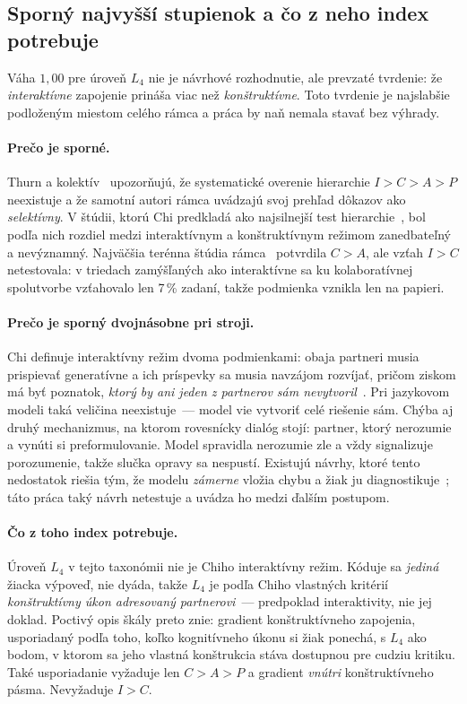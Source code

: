 \subsection{Sporný najvyšší stupienok a čo z neho index potrebuje}
\label{sec:icap-rung}

Váha $1{,}00$ pre úroveň $L_4$ nie je návrhové rozhodnutie, ale prevzaté tvrdenie: že \emph{interaktívne} zapojenie prináša viac než \emph{konštruktívne}. Toto tvrdenie je najslabšie podloženým miestom celého rámca a práca by naň nemala stavať bez výhrady.

\paragraph{Prečo je sporné.} Thurn a kolektív~\cite{thurn2023icapcritique} upozorňujú, že systematické overenie hierarchie $I>C>A>P$ neexistuje a že samotní autori rámca uvádzajú svoj prehľad dôkazov ako \emph{selektívny}. V štúdii, ktorú Chi predkladá ako najsilnejší test hierarchie~\cite{menekse2013dola}, bol podľa nich rozdiel medzi interaktívnym a konštruktívnym režimom zanedbateľný a nevýznamný. Najväčšia terénna štúdia rámca~\cite{chi2018translating} potvrdila $C>A$, ale vzťah $I>C$ netestovala: v triedach zamýšľaných ako interaktívne sa ku kolaboratívnej spolutvorbe vzťahovalo len 7\,\% zadaní, takže podmienka vznikla len na papieri.

\paragraph{Prečo je sporný dvojnásobne pri stroji.} Chi definuje interaktívny režim dvoma podmienkami: obaja partneri musia prispievať generatívne a ich príspevky sa musia navzájom rozvíjať, pričom ziskom má byť poznatok, \emph{ktorý by ani jeden z partnerov sám nevytvoril}~\cite{chi2018translating}. Pri jazykovom modeli taká veličina neexistuje~--- model vie vytvoriť celé riešenie sám. Chýba aj druhý mechanizmus, na ktorom rovesnícky dialóg stojí: partner, ktorý nerozumie a vynúti si preformulovanie. Model spravidla nerozumie zle a vždy signalizuje porozumenie, takže slučka opravy sa nespustí. Existujú návrhy, ktoré tento nedostatok riešia tým, že modelu \emph{zámerne} vložia chybu a žiak ju diagnostikuje~\cite{kucharavy2025proteges}; táto práca taký návrh netestuje a uvádza ho medzi ďalším postupom.

\paragraph{Čo z toho index potrebuje.} Úroveň $L_4$ v tejto taxonómii nie je Chiho interaktívny režim. Kóduje sa \emph{jediná} žiacka výpoveď, nie dyáda, takže $L_4$ je podľa Chiho vlastných kritérií \emph{konštruktívny úkon adresovaný partnerovi}~--- predpoklad interaktivity, nie jej doklad. Poctivý opis škály preto znie: gradient konštruktívneho zapojenia, usporiadaný podľa toho, koľko kognitívneho úkonu si žiak ponechá, s $L_4$ ako bodom, v ktorom sa jeho vlastná konštrukcia stáva dostupnou pre cudziu kritiku. Také usporiadanie vyžaduje len $C>A>P$ a gradient \emph{vnútri} konštruktívneho pásma. Nevyžaduje $I>C$.

